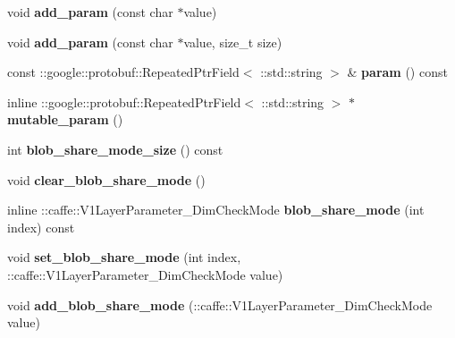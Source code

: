 \begin{DoxyCompactItemize}
void {\bfseries add\+\_\+param} (const char $\ast$value)
\item 
\mbox{\label{classcaffe_1_1_v1_layer_parameter_af2a08a02ab4ee034791756e411821485}} 
void {\bfseries add\+\_\+param} (const char $\ast$value, size\+\_\+t size)
\item 
\mbox{\label{classcaffe_1_1_v1_layer_parameter_a2ec4ee6e248ccc075fdb6ee655745ad8}} 
const \+::google\+::protobuf\+::\+Repeated\+Ptr\+Field$<$ \+::std\+::string $>$ \& {\bfseries param} () const
\item 
\mbox{\label{classcaffe_1_1_v1_layer_parameter_a269087254ca77840edd96934c34d3fef}} 
inline \+::google\+::protobuf\+::\+Repeated\+Ptr\+Field$<$ \+::std\+::string $>$ $\ast$ {\bfseries mutable\+\_\+param} ()
\item 
\mbox{\label{classcaffe_1_1_v1_layer_parameter_af2e0d410f50c6fd4f5d491d57772af51}} 
int {\bfseries blob\+\_\+share\+\_\+mode\+\_\+size} () const
\item 
\mbox{\label{classcaffe_1_1_v1_layer_parameter_a760c2e548449ac71c13865a3137a4e19}} 
void {\bfseries clear\+\_\+blob\+\_\+share\+\_\+mode} ()
\item 
\mbox{\label{classcaffe_1_1_v1_layer_parameter_a2e9526e90928edd4b8506c32ba0dc654}} 
inline \+::caffe\+::\+V1\+Layer\+Parameter\+\_\+\+Dim\+Check\+Mode {\bfseries blob\+\_\+share\+\_\+mode} (int index) const
\item 
\mbox{\label{classcaffe_1_1_v1_layer_parameter_a3534f52b865b9784518e3b538f2a5825}} 
void {\bfseries set\+\_\+blob\+\_\+share\+\_\+mode} (int index, \+::caffe\+::\+V1\+Layer\+Parameter\+\_\+\+Dim\+Check\+Mode value)
\item 
\mbox{\label{classcaffe_1_1_v1_layer_parameter_aced562cfd496006ce778d717acc50a77}} 
void {\bfseries add\+\_\+blob\+\_\+share\+\_\+mode} (\+::caffe\+::\+V1\+Layer\+Parameter\+\_\+\+Dim\+Check\+Mode value)
\item 
\mbox{\label{classcaffe_1_1_v1_layer_parameter_af792c999e12c2efb64e2397249d3a458}} 

\end{DoxyCompactItemize}
